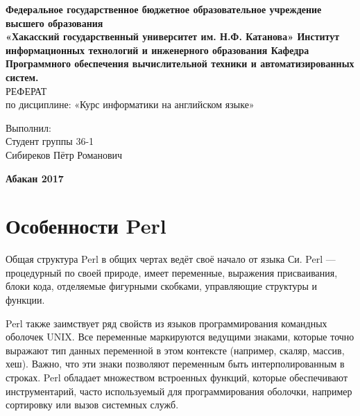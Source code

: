 \documentclass[14pt,article]{scrartcl}
\begin{document}

\begin{center}
\normalsize \textbf{Федеральное государственное бюджетное образовательное учреждение
высшего образования\\
«Хакасский государственный университет им. Н.Ф. Катанова»
Институт информационных технологий и инженерного образования
Кафедра Программного обеспечения вычислительной техники и
автоматизированных систем.}\\ 
\hfill \break
\hfill \break
\hfill \break
\hfill \break
\large{РЕФЕРАТ}\\
\hfill\break
\large{по дисциплине:
«Курс информатики на английском языке»}\\
\hfill \break
\hfill \break
\hfill \break

\hfill \break
\hfill \break
\end{center}

\hfill 
\hfill \break
\hfill \break
\hfill \break
\hfill \break
\hfill \break
\hfill \break
\begin{flushright}
 Выполнил:  \\ Студент группы 36-1 \\
 Сибиреков Пётр Романович
\end{flushright}
\hfill \break
\hfill \break
\hfill \break
\hfill \break


\begin{center} \small{\bf Абакан 2017}  \end{center}
\thispagestyle{empty} %
\newpage
\tableofcontents %
\newpage

\section*{Особенности Perl}
\onehalfspacing
Общая структура Perl в общих чертах ведёт своё начало от языка Си. Perl — процедурный по своей природе, имеет переменные, выражения присваивания, блоки кода, отделяемые фигурными скобками, управляющие структуры и функции.

Perl также заимствует ряд свойств из языков программирования командных оболочек UNIX. Все переменные маркируются ведущими знаками, которые точно выражают тип данных переменной в этом контексте (например, скаляр, массив, хеш). Важно, что эти знаки позволяют переменным быть интерполированным в строках. Perl обладает множеством встроенных функций, которые обеспечивают инструментарий, часто используемый для программирования оболочки, например сортировку или вызов системных служб.
\end{document}
